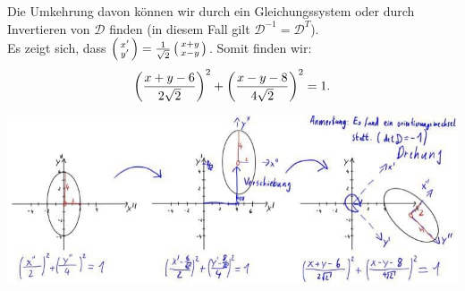 \begin{Beispiel}
\begin{itemize}
\begin{itemize}
        Die Umkehrung davon können wir durch ein Gleichungssystem oder durch Invertieren von $\mathcal{D}$ finden (in diesem Fall gilt $\mathcal{D}^{-1}=\mathcal{D}^T$).\\
        Es zeigt sich, dass $ \left(\begin{smallmatrix}x'\\y'\end{smallmatrix}\right)=\frac{1}{\sqrt{2}}\left(\begin{smallmatrix}x+y\\x-y\end{smallmatrix}\right)$. Somit finden wir:
        \begin{equation*}
            \left({\frac{x+y-6}{2\sqrt{2}}}\right)^2+\left({\frac{x-y-8}{4\sqrt{2}}}\right)^2=1.
        \end{equation*}
    \end{itemize}
\end{itemize}
\begin{center}
    \includegraphics[width=.95\textwidth]{Dateien/05/05DrehungEllipse.jpg}
\end{center}
\end{Beispiel}

